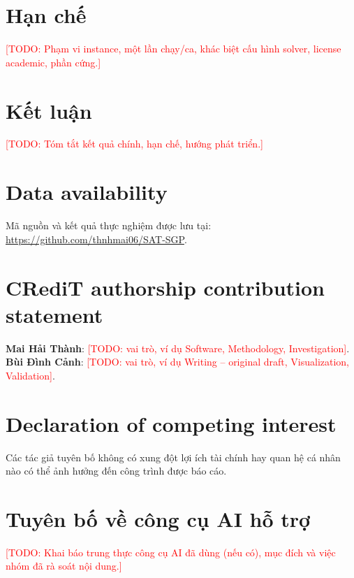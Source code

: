 \documentclass[a4paper,fleqn]{cas-sc}
\newcommand{\TODO}[1]{\textcolor{red}{[TODO: #1]}}
\newcommand{\RepositoryURL}{https://github.com/thnhmai06/SAT-SGP}
\begin{document}

\section{Hạn chế}
\TODO{Phạm vi instance, một lần chạy/ca, khác biệt cấu hình solver, license
academic, phần cứng.}

\section{Kết luận}
\TODO{Tóm tắt kết quả chính, hạn chế, hướng phát triển.}

\section*{Data availability}
Mã nguồn và kết quả thực nghiệm được lưu tại:
\url{\RepositoryURL}.

\section*{CRediT authorship contribution statement}
\textbf{Mai Hải Thành}: \TODO{vai trò, ví dụ Software, Methodology, Investigation}.
\textbf{Bùi Đình Cảnh}: \TODO{vai trò, ví dụ Writing -- original draft, Visualization, Validation}.

\section*{Declaration of competing interest}
Các tác giả tuyên bố không có xung đột lợi ích tài chính hay quan hệ cá nhân nào
có thể ảnh hưởng đến công trình được báo cáo.

\section*{Tuyên bố về công cụ AI hỗ trợ}
\TODO{Khai báo trung thực công cụ AI đã dùng (nếu có), mục đích và việc nhóm đã
rà soát nội dung.}



\end{document}
